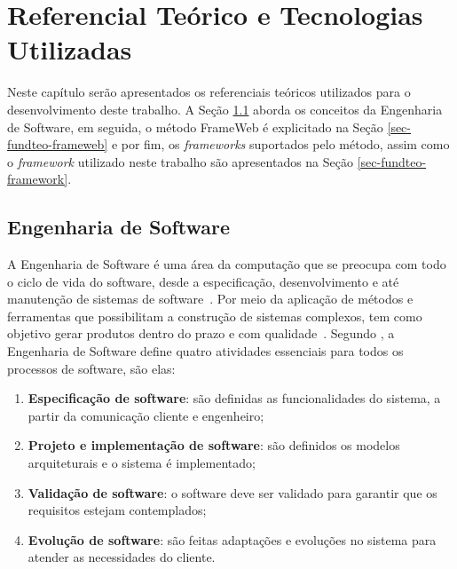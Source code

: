 \chapter{Referencial Teórico e Tecnologias Utilizadas}
\label{chap-referencial}



Neste capítulo serão apresentados os referenciais teóricos utilizados para o desenvolvimento
deste trabalho. A Seção \ref{sec-fundteo-engsoft} aborda os conceitos da Engenharia de Software,
em seguida, o método FrameWeb é explicitado na Seção \ref{sec-fundteo-frameweb}
e por fim, os \textit{frameworks} suportados pelo método, assim como o \textit{framework}
utilizado neste trabalho são apresentados na Seção \ref{sec-fundteo-framework}.

\section{Engenharia de Software}
\label{sec-fundteo-engsoft}

A Engenharia de Software é uma área da computação que se preocupa com todo o ciclo de vida do software,
desde a especificação, desenvolvimento e até manutenção de sistemas de software~\cite{sommerville:2011}.
Por meio da aplicação de métodos e ferramentas que possibilitam a construção de sistemas complexos,
tem como objetivo gerar produtos dentro do prazo e com qualidade~\cite{pressman:2011}.
Segundo , a Engenharia de Software define quatro atividades
essenciais para todos os processos de software, são elas:


\begin{enumerate}
    \item \textbf{Especificação de software}: são definidas as funcionalidades do 
        sistema, a partir da comunicação cliente e engenheiro;
    \item \textbf{Projeto e implementação de software}: são definidos os modelos 
        arquiteturais e o sistema é implementado;
    \item \textbf{Validação de software}: o software deve ser validado para garantir 
        que os requisitos estejam contemplados;
    \item \textbf{Evolução de software}: são feitas adaptações e evoluções no sistema 
        para atender as necessidades do cliente.
\end{enumerate}

